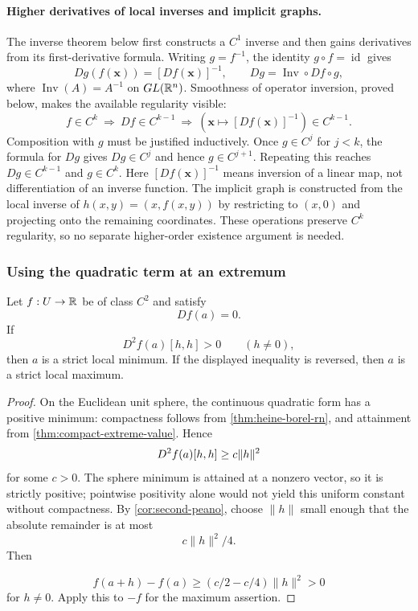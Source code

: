\paragraph{Higher derivatives of local inverses and implicit graphs.}
The inverse theorem below first constructs a $C^1$ inverse and then gains
derivatives from its first-derivative formula. Writing $g=f^{-1}$, the
identity $g\circ f=\operatorname{id}$ gives
\[
Dg(f(\mathbf{x}))=[Df(\mathbf{x})]^{-1},\qquad
Dg=\operatorname{Inv}\circ Df\circ g,
\]
where $\operatorname{Inv}(A)=A^{-1}$ on $GL(\mathbb{R}^n)$. Smoothness of
operator inversion, proved below, makes the available regularity visible:
\[
f\in C^k\ \Longrightarrow\ Df\in C^{k-1}
\ \Longrightarrow\ (\mathbf{x}\mapsto[Df(\mathbf{x})]^{-1})\in C^{k-1}.
\]
Composition with $g$ must be justified inductively. Once $g\in C^j$
for $j<k$, the formula for $Dg$ gives $Dg\in C^j$ and hence
$g\in C^{j+1}$. Repeating this reaches $Dg\in C^{k-1}$ and $g\in C^k$.
Here $[Df(\mathbf{x})]^{-1}$ means inversion of a linear map, not differentiation
of an inverse function. The implicit graph is constructed from the local
inverse of $h(x,y)=(x,f(x,y))$ by restricting to $(x,0)$ and projecting
onto the remaining coordinates. These operations preserve $C^k$
regularity, so no separate higher-order existence argument is needed.

\subsubsection*{Using the quadratic term at an extremum}
\begin{corollary}
\label{cor:second-order-test}
Let $f:U\to\mathbb{R}$ be of class $C^2$ and satisfy
\[
Df(a)=0.
\]
If
\[
D^2f(a)[h,h]>0
\qquad(h\ne0),
\]
then $a$ is a strict local minimum.  If the displayed inequality is reversed,
then $a$ is a strict local maximum.
\end{corollary}
\begin{proof}
On the Euclidean unit sphere, the continuous quadratic form has a positive
minimum: compactness follows from \cref{thm:heine-borel-rn}, and
attainment from \cref{thm:compact-extreme-value}.  Hence
\[
D^2f(a)[h,h]\geq c\lVert h\rVert^2
\]
for some $c>0$.  The sphere minimum is attained at a nonzero vector, so it is strictly
positive; pointwise positivity alone would not yield this uniform constant
without compactness. By \cref{cor:second-peano}, choose $\|h\|$ small
enough that the absolute remainder is at most
\[
c\|h\|^2/4.
\]
 Then

\[
f(a+h)-f(a)\geq(c/2-c/4)\|h\|^2>0
\]
 for $h\ne0$.  Apply this to $-f$ for the
maximum assertion.
\end{proof}





